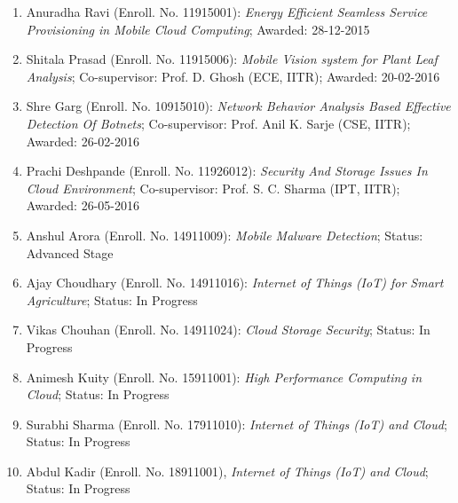 \begin{enumerate} %
		\item Anuradha Ravi (Enroll. No. 11915001): \textit{Energy Efficient Seamless Service Provisioning in Mobile Cloud Computing}; Awarded: 28-12-2015
		\item Shitala Prasad (Enroll. No. 11915006): \textit{Mobile Vision system for Plant Leaf Analysis}; Co-supervisor: Prof. D. Ghosh (ECE, IITR); Awarded: 20-02-2016
		\item Shre Garg (Enroll. No. 10915010): \textit{Network Behavior Analysis Based Effective Detection Of Botnets}; Co-supervisor: Prof. Anil K. Sarje (CSE, IITR); Awarded: 26-02-2016
		\item Prachi Deshpande (Enroll. No. 11926012): \textit{Security And Storage Issues In Cloud Environment}; Co-supervisor: Prof. S. C. Sharma (IPT, IITR); Awarded: 26-05-2016
					\item Anshul Arora (Enroll. No. 14911009): \textit{Mobile Malware Detection}; Status: Advanced Stage
			\item Ajay Choudhary (Enroll. No. 14911016): \textit{Internet of Things (IoT) for Smart Agriculture}; Status: In Progress
			\item Vikas Chouhan (Enroll. No. 14911024): \textit{Cloud Storage Security}; Status: In Progress
			\item Animesh Kuity (Enroll. No. 15911001): \textit{High Performance Computing in Cloud};	Status: In Progress	 	
			\item Surabhi Sharma (Enroll. No. 17911010): \textit{Internet of Things (IoT) and Cloud}; Status: In Progress	
						\item Abdul Kadir (Enroll. No. 18911001), \textit{Internet of Things (IoT) and Cloud}; Status: In Progress
			\end{enumerate}
